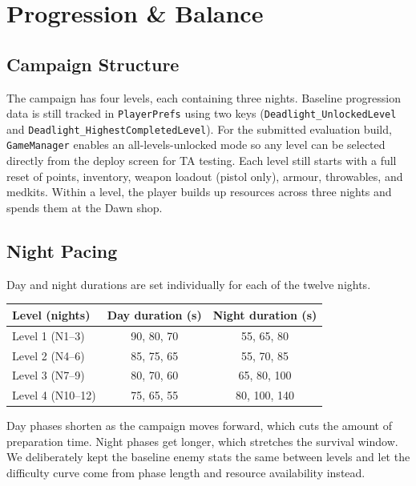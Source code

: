 \documentclass[11pt,a4paper]{article}
\begin{document}
\section{Progression \& Balance}

\subsection{Campaign Structure}

The campaign has four levels, each containing three nights. Baseline progression data is still tracked in \texttt{PlayerPrefs} using two keys (\texttt{Deadlight\_UnlockedLevel} and \texttt{Deadlight\_HighestCompletedLevel}). For the submitted evaluation build, \texttt{GameManager} enables an all-levels-unlocked mode so any level can be selected directly from the deploy screen for TA testing. Each level still starts with a full reset of points, inventory, weapon loadout (pistol only), armour, throwables, and medkits. Within a level, the player builds up resources across three nights and spends them at the Dawn shop.

\subsection{Night Pacing}

Day and night durations are set individually for each of the twelve nights.

\begin{center}
\small
\begin{tabular}{@{} l c c @{}}
\toprule
\textbf{Level (nights)} & \textbf{Day duration (s)} & \textbf{Night duration (s)} \\
\midrule
Level 1 (N1--3) & 90, 80, 70 & 55, 65, 80 \\
Level 2 (N4--6) & 85, 75, 65 & 55, 70, 85 \\
Level 3 (N7--9) & 80, 70, 60 & 65, 80, 100 \\
Level 4 (N10--12) & 75, 65, 55 & 80, 100, 140 \\
\bottomrule
\end{tabular}
\end{center}

Day phases shorten as the campaign moves forward, which cuts the amount of preparation time. Night phases get longer, which stretches the survival window. We deliberately kept the baseline enemy stats the same between levels and let the difficulty curve come from phase length and resource availability instead.
\end{document}
